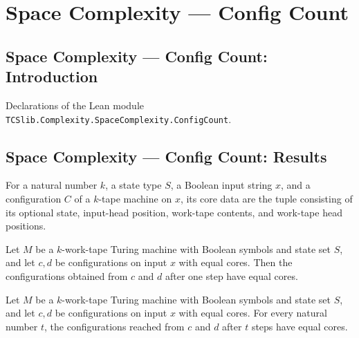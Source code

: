 \section{Space Complexity --- Config Count}
\subsection*{Space Complexity --- Config Count: Introduction}

Declarations of the Lean module \texttt{TCSlib.Complexity.SpaceComplexity.ConfigCount}.

\subsection*{Space Complexity --- Config Count: Results}

\begin{definition}
\label{Turing.MultiTapeTM.ConfigCount.core}
\leanok
{}
For a natural number $k$, a state type $S$, a Boolean input string $x$, and a
configuration $C$ of a $k$-tape machine on $x$, its core data are the tuple consisting
of its optional state, input-head position, work-tape contents, and work-tape head
positions.
\end{definition}

\begin{lemma}
\label{Turing.MultiTapeTM.ConfigCount.core_step}
\leanok
{}
Let $M$ be a $k$-work-tape Turing machine with Boolean symbols and state set $S$, and
let $c,d$ be configurations on input $x$ with equal cores. Then the configurations
obtained from $c$ and $d$ after one step have equal cores.
\end{lemma}

\begin{lemma}
\label{Turing.MultiTapeTM.ConfigCount.core_runFrom}
\leanok
{}
Let $M$ be a $k$-work-tape Turing machine with Boolean symbols and state set $S$, and
let $c,d$ be configurations on input $x$ with equal cores. For every natural number $t$,
the configurations reached from $c$ and $d$ after $t$ steps have equal cores.
\end{lemma}

